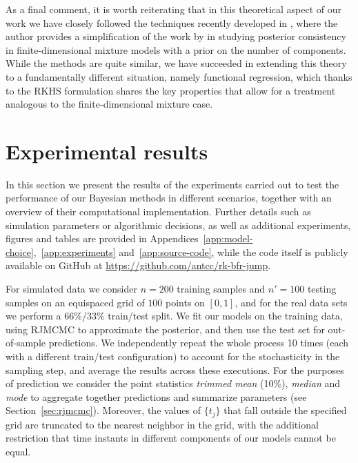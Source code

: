 \documentclass{article}
\numberwithin{equation}{section}
\theoremstyle{plain}
\theoremstyle{definition}
\begin{document}
As a final comment, it is worth reiterating that in this theoretical aspect of our work we have closely followed the techniques recently developed in \citet{miller2023consistency}, where the author provides a simplification of the work by \citet{nobile1994bayesian} in studying posterior consistency in finite-dimensional mixture models with a prior on the number of components. While the methods are quite similar, we have succeeded in extending this theory to a fundamentally different situation, namely functional regression, which thanks to the RKHS formulation shares the key properties that allow for a treatment analogous to the finite-dimensional mixture case.


\section{Experimental results}\label{sec:results}

In this section we present the results of the experiments carried out to test the performance of our Bayesian methods in different scenarios, together with an overview of their computational implementation. Further details such as simulation parameters or algorithmic decisions, as well as additional experiments, figures and tables are provided in Appendices~\ref{app:model-choice},~\ref{app:experiments} and~\ref{app:source-code}, while the code itself is publicly available on GitHub at \url{https://github.com/antcc/rk-bfr-jump}. 

For simulated data we consider \(n=200\) training samples and \(n'=100\) testing samples on an equispaced grid of \(100\) points on \([0, 1]\), and for the real data sets we perform a 66\%/33\% train/test split. We fit our models on the training data, using RJMCMC to approximate the posterior, and then use the test set for out-of-sample predictions. We independently repeat the whole process 10 times (each with a different train/test configuration) to account for the stochasticity in the sampling step, and average the results across these executions. For the purposes of prediction we consider the point statistics \textit{trimmed mean} (10\%), \textit{median} and \textit{mode} to aggregate together predictions and summarize parameters (see Section~\ref{sec:rjmcmc}). Moreover, the values of \(\{t_j\}\) that fall outside the specified grid are truncated to the nearest neighbor in the grid, with the additional restriction that time instants in different components of our models cannot be equal.
\end{document}
